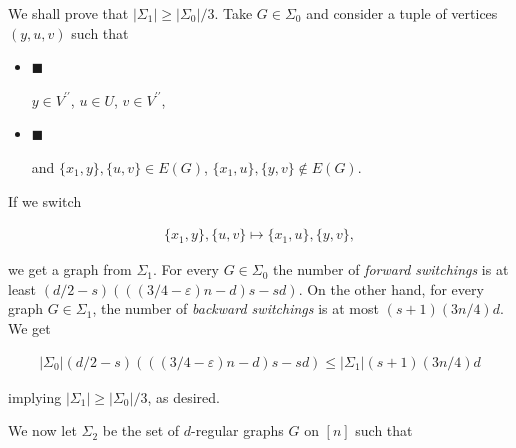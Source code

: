 We shall prove that $|\Sigma_{1}|\geq|\Sigma_{0}|/3$.
Take $G\in\Sigma_{0}$ and consider a tuple of vertices $(y,u,v)$ such that\par


\begin{itemize}


\item[] 
$\blacksquare$ 


$y\in V^{\prime\prime}$, $u\in U$, $v\in V^{\prime\prime}$,\par





\item[] 
$\blacksquare$ 


and $\{x_{1},y\},\{u,v\}\in E(G)$, $\{x_{1},u\},\{y,v\}\notin E(G)$.\par





\end{itemize}


If we switch\par


\[\begin{gathered}
\{x_{1},y\},\{u,v\}\mapsto\{x_{1},u\},\{y,v\},
\end{gathered}\]


we get a graph from $\Sigma_{1}$. For every $G\in\Sigma_{0}$ the number of \emph{forward switchings} is at least $(d/2-s)(((3/4-\varepsilon)n-d)s-sd)$. On the other hand, for every graph $G\in\Sigma_{1}$, the number of \emph{backward switchings} is at most $(s+1)(3n/4)d$. We get\par


\[\begin{gathered}
|\Sigma_{0}|(d/2-s)(((3/4-\varepsilon)n-d)s-sd)\leq|\Sigma_{1}|(s+1)(3n/4)d
\end{gathered}\]


implying $|\Sigma_{1}|\geq|\Sigma_{0}|/3$, as desired.\par




We now let $\Sigma_{2}$ be the set of $d$-regular graphs $G$ on $[n]$ such that\par


